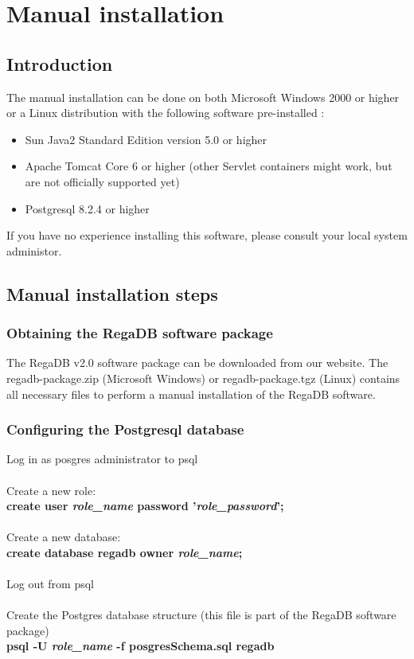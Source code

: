 \chapter{Manual installation}
\label{chapter:manual_install}

\section{Introduction}
The manual installation can be done on both Microsoft Windows 2000 or higher or a Linux distribution with the following software pre-installed : 
\begin{itemize}
\item Sun Java2 Standard Edition version 5.0 or higher
\item Apache Tomcat Core 6 or higher (other Servlet containers might work, but are not officially supported yet)
\item Postgresql 8.2.4 or higher
\end{itemize}
If you have no experience installing this software, please consult your local system administor.

\section{Manual installation steps}
\subsection{Obtaining the RegaDB software package}
The RegaDB v2.0 software package can be downloaded from our website. The regadb-package.zip (Microsoft Windows) or regadb-package.tgz (Linux) contains all necessary files to perform a manual installation of the RegaDB software.

\subsection{Configuring the Postgresql database}
Log in as posgres administrator to psql
\\
\\
Create a new role:
\\
\textbf{create user \textit{role\_name} password '\textit{role\_password}';}
\\
\\
Create a new database:
\\
\textbf{create database regadb owner \textit{role\_name};}
\\
\\
Log out from psql
\\
\\
Create the Postgres database structure (this file is part of the RegaDB software package)
\\
\textbf{psql -U \textit{role\_name} -f posgresSchema.sql regadb}

